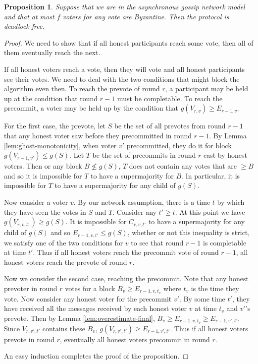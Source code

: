\documentclass{article}
\newtheorem{proposition}[theorem]{Proposition}
\begin{document}
\begin{proposition} Suppose that we are in the asynchronous gossip network model and that at most $f$ voters for any vote are Byzantine. Then the protocol is deadlock free.\end{proposition}

\begin{proof} We need to show that if all honest participants reach some vote, then all of them eventually reach the next.

If all honest voters reach a vote, then they will vote and all honest participants see their votes. We need to deal with the two conditions that might block the algorithm even then.
To reach the prevote of round $r$, a participant may be held up at the condition that round $r-1$ must be completable. To reach the precommit, a voter may be held up by the condition that $g(V_{r,v}) \geq E_{r-1,v}$.

For the first case, the prevote, let $S$ be the set of all prevotes from round $r-1$ that any honest voter saw before they precommitted in round $r-1$.
By Lemma \ref{lem:ghost-monotonicity}, when voter $v'$ precommitted, they do it for block $g(V_{r-1,v'}) \leq g(S)$.
Let $T$ be the set of precommits in round $r$ cast by honest voters.
Then or any block $B \not\leq g(S)$, $T$ does not contain any votes that are $\geq B$ and so it is impossible for $T$ to have a supermajority for $B$.
In particular, it is impossible for $T$ to have a supermajority for any child of $g(S)$. 

Now consider a voter $v$. By our network assumption, there is a time $t$ by which they have seen the votes in $S$ and $T$. Consider any $t' \geq t$.
At this point we have $g(V_{r,v,t;}) \geq g(S)$. It is impossible for $C_{r,v,t'}$ to have a supermajority for any child of $g(S)$ and so $E_{r-1,v,t'} \leq g(S)$, whether or not this inequality is strict, we satisfy one of the two conditions for $v$ to see that round $r-1$ is completable at time $t'$.
Thus if all honest voters reach the precommit vote of round $r-1$, all honest voters reach the prevote of round $r$.

Now we consider the second case, reaching the precommit. 
Note that any honest prevoter in round $r$ votes for a block $B_v \geq E_{r-1,v,t_v}$ where $t_v$ is the time they vote. Now consider any honest voter for the precommit $v'$. By some time $t'$, they have received all the messages received by each honest voter $v$ at time $t_v$ and $v'$'s prevote. 
Then by Lemma \ref{lem:overestimate-final}, $B_v \geq E_{r-1,v,t_v} \geq E_{r-1,v',t'}$. Since $V_{r,v',t'}$ contains these $B_v$, $g(V_{r,v',t'}) \geq  E_{r-1,v',t'}$. Thus if all honest voters prevote in round $r$, eventually all honest voters precommit in round $r$.

An easy induction completes the proof of the proposition.
\end{proof}
\end{document}
